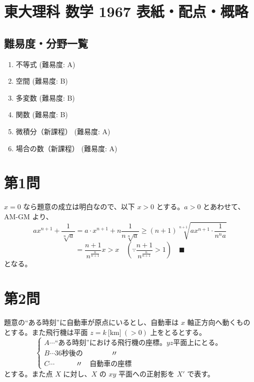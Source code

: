 \documentclass[../main.tex]{subfiles}
\begin{document}
\section*{東大理科 数学 1967 表紙・配点・概略}

\subsection*{難易度・分野一覧}
\begin{enumerate}
  \item 不等式 (難易度: A)
  \item 空間 (難易度: B)
  \item 多変数 (難易度: B)
  \item 関数 (難易度: B)
  \item 微積分（新課程） (難易度: A)
  \item 場合の数（新課程） (難易度: A)
\end{enumerate}

\newpage

\section*{第1問}

\noindent
[\textbf{解}] $x=0$ なら題意の成立は明白なので、以下 $x>0$ とする。$a>0$ とあわせて、AM-GM より、
\[
  a x^{n+1} + \frac{1}{\sqrt[n]{a}} = a \cdot x^{n+1} + n \frac{1}{n \sqrt[n]{a}} \ge (n+1) \sqrt[n+1]{ a x^{n+1} \cdot \frac{1}{n^n a} }
\]
\[
  = \frac{n+1}{n^{\frac{n}{n+1}}} x > x \quad \left( \because \frac{n+1}{n^{\frac{n}{n+1}}} > 1 \right) \quad \blacksquare
\]
となる。

\newpage

\section*{第2問}

\noindent
[\textbf{解}] 題意の“ある時刻”に自動車が原点にいるとし、自動車は $x$ 軸正方向へ動くものとする。また飛行機は平面 $z=k\ \text{[km]}\ (>0)$ 上をとるとする。
\[
  \begin{cases}
    A \cdots \text{“ある時刻”における飛行機の座標。} yz \text{平面上にとる。} \\
    B \cdots 36 \text{秒後の} \qquad \qquad \text{〃} \\
    C \cdots \qquad \quad \text{〃} \quad \text{自動車の座標}
  \end{cases}
\]
とする。また点 $X$ に対し、$X$ の $xy$ 平面への正射影を $X'$ で表す。
\end{document}
